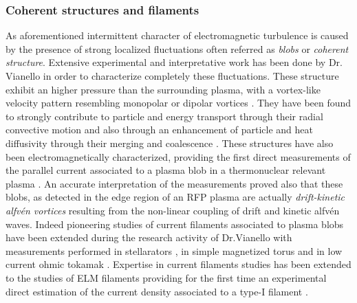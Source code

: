 \documentclass[12pt,a4paper]{article}
\begin{document}
\subsubsection*{Coherent structures and filaments}
As aforementioned intermittent character of electromagnetic turbulence
is caused by the presence of strong localized fluctuations often
referred as \emph{blobs} or \emph{coherent structure}. Extensive
experimental and interpretative work has been done by Dr. Vianello in
order to characterize completely these fluctuations. These structure
exhibit an higher pressure than the surrounding plasma, with a
vortex-like velocity pattern resembling monopolar or dipolar vortices \cite{Antoni:2006p3585,Serianni:2007p3575}.
They have been
found to strongly contribute to particle and energy transport through
their radial convective motion and also through an enhancement of
particle and heat diffusivity through their merging and coalescence
\cite{Spolaore:2004p245,Spolaore:2005p2243}.
These structures have also been electromagnetically characterized,
providing the first direct measurements of the parallel current
associated to a plasma blob in a thermonuclear relevant plasma
\cite{Spolaore:2009p4115,Spolaore2010}. An accurate interpretation of the
measurements proved also that these blobs, as detected in the edge
region of an RFP plasma are actually \emph{drift-kinetic alfv\'en
  vortices} \cite{Vianello:2010p4670} resulting from the non-linear
coupling of drift and kinetic alfv\'en waves. Indeed pioneering
studies of current filaments associated to plasma blobs have been
extended during the research activity of Dr.Vianello with
measurements performed in stellarators \cite{Spolaore:eps2012}, in
simple magnetized torus \cite{Furno:2011cs,0741-3335-53-12-124016} and
in low current ohmic tokamak \cite{Spolaore:eps2012}. Expertise in
current filaments studies has been extended to the studies of ELM
filaments providing for the first time an experimental direct estimation of the
current density associated to a type-I filament
\cite{PhysRevLett.106.125002,Naulin:2011im,Muller:2011kj}.
\end{document}

